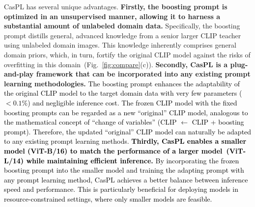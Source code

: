 \documentclass[runningheads]{llncs}
\newcommand{\implus}[1]{\textcolor{black}{#1}}
\newcommand{\rewrite}[1]{\textcolor{black}{#1}}%
\begin{document}
CasPL has several unique advantages. \textbf{Firstly, the boosting prompt is optimized in an unsupervised manner, allowing it to harness a substantial amount of unlabeled domain data.} Specifically, the boosting prompt distills general, advanced knowledge from a senior larger CLIP teacher using unlabeled domain images. This knowledge inherently comprises general domain priors, which, in turn, fortify the original CLIP model against the risks of overfitting in this domain~(Fig.~\ref{fig:compare}(c)). \textbf{Secondly, CasPL is a plug-and-play framework that can be incorporated into any existing prompt learning methodologies.} \implus{The boosting prompt enhances the adaptability of the original CLIP model to the target domain data with very few parameters {($<0.1\%$)} and negligible inference cost. The frozen CLIP model with the fixed boosting prompts can be regarded as a new ``original'' CLIP model, analogous to the mathematical concept of ``change of variables'' (CLIP $\longleftarrow$ CLIP + boosting prompt). Therefore, the updated ``original'' CLIP model can naturally be adapted to any existing prompt learning methods.} \rewrite{\textbf{Thirdly, CasPL enables a smaller model (ViT-B/16) to match the performance of a larger model~(ViT-L/14) while maintaining efficient inference.} By incorporating the frozen boosting prompt into the smaller model and training the adapting prompt with any prompt learning method, CasPL achieves a better balance between inference speed and performance. This is particularly beneficial for deploying models in resource-constrained settings, where only smaller models are feasible.}
\end{document}
